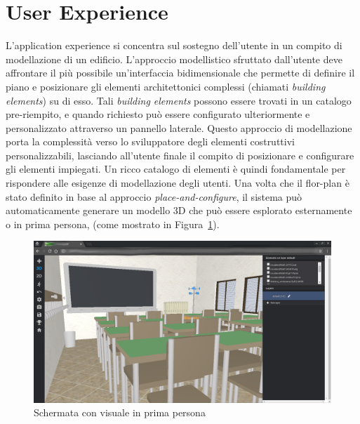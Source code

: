 \section{User Experience}
\label{sec:chapter_2_section_5}


L'application experience si concentra sul sostegno dell'utente in un compito di modellazione di un edificio.
L'approccio modellistico sfruttato dall'utente deve affrontare il pi\`u possibile un'interfaccia bidimensionale che permette
di definire il piano e posizionare gli elementi architettonici complessi (chiamati \emph{building elements}) su di esso.
Tali \emph{building elements} possono essere trovati in un catalogo pre-riempito, e quando richiesto pu\`o essere
configurato ulteriormente e personalizzato attraverso un pannello laterale. Questo approccio
di modellazione porta la complessit\`a verso lo sviluppatore degli elementi costruttivi personalizzabili,
lasciando all'utente finale il compito di posizionare e configurare gli elementi impiegati.
Un ricco catalogo di elementi \`e quindi fondamentale per rispondere alle esigenze di modellazione degli utenti.
Una volta che il flor-plan \`e stato definito in base al approccio \emph{place-and-configure}, il sistema pu\`o automaticamente
generare un modello 3D che pu\`o essere esplorato esternamente o in prima persona, (come mostrato in Figura~\ref{fig:3D-school}).

\begin{figure}[htbp] %
   \centering
   \includegraphics[width=1\linewidth]{images/3d-school}
   \caption{Schermata con visuale in prima persona}
   \label{fig:3D-school}
\end{figure}
\newpage

